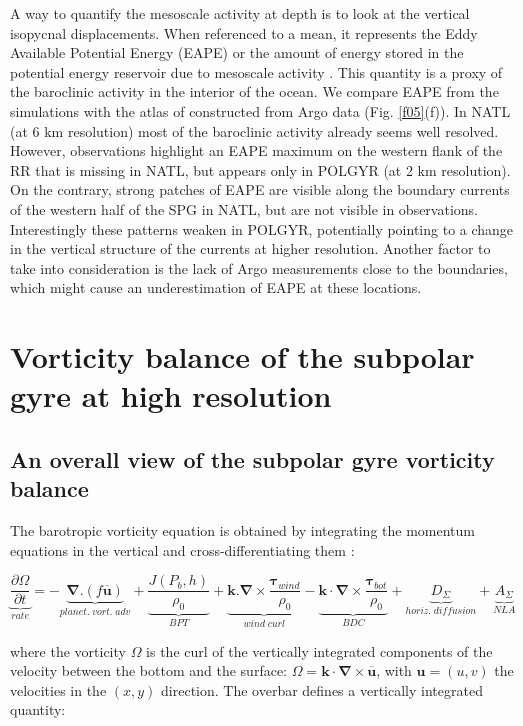 \documentclass[os, manuscript]{copernicus}
\begin{document}
A way to quantify the mesoscale activity at depth is to look at the vertical isopycnal displacements. When referenced to a mean, it represents the Eddy Available Potential Energy (EAPE) or the amount of energy stored in the potential energy reservoir due to mesoscale activity \citep{lorenz1955}. This quantity is a proxy of the baroclinic activity in the interior of the ocean. We compare EAPE from the simulations with the atlas of \citet{roullet2014} constructed from Argo data (Fig. \ref{f05}(f)). In NATL (at 6 km resolution) most of the baroclinic activity already seems well resolved. However, observations highlight an EAPE maximum on the western flank of the RR that is missing in NATL, but appears only in POLGYR (at 2 km resolution). On the contrary, strong patches of EAPE are visible along the boundary currents of the western half of the SPG in NATL, but are not visible in observations. Interestingly these patterns weaken in POLGYR, potentially pointing to a change in the vertical structure of the currents at higher resolution. Another factor to take into consideration is the lack of Argo measurements close to the boundaries, which might cause an underestimation of EAPE at these locations.

\section{Vorticity balance of the subpolar gyre at high resolution}
\subsection{An overall view of the subpolar gyre vorticity balance}

The barotropic vorticity equation is obtained by integrating the momentum equations in the vertical and cross-differentiating them \citep{gula2015}:

\begin{equation}
\underbrace{\frac{\partial \Omega}{\partial t}}_{rate} = -\underbrace{\mathbf{\nabla}.(f \mathbf{\overline{u}})}_{planet.\;vort.\;adv}+\underbrace{\frac{J(P_b,h)}{\rho _0}}_{BPT} +\underbrace{\mathbf{k}.\mathbf{\nabla} \times \frac{\mathbf{\tau} _{wind}}{\rho_{0}}}_{wind\;curl} -\underbrace{\mathbf{k} \cdot \mathbf{\nabla} \times \frac{\mathbf{\tau} _{bot}}{\rho_{0}}}_{BDC} +\underbrace{D_{\Sigma}}_{horiz.\;diffusion}+\underbrace{A_{\Sigma}}_{NLA}
\end{equation}


where the vorticity $\Omega$ is the curl of the vertically integrated components of the velocity between the bottom and the surface: $\Omega = \mathbf{k} \cdot \mathbf{\nabla} \times \overline{\mathbf{u}}$, with $\mathbf{u} = (u,v)$ the velocities in the $(x,y)$ direction. The overbar defines a vertically integrated quantity:
\end{document}
